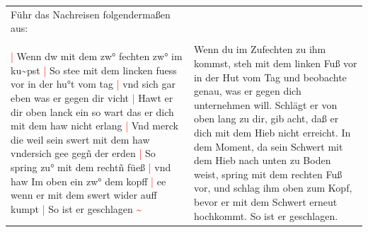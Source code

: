 \begin{longtable}{p{6.25cm}p{6.25cm}}
{{        Führ das Nachreisen folgendermaßen aus:}}
    \\
    \\
    \textcolor{red}{|} Wenn dw mit dem zw° fechten zw° im ku\textasciitilde{}pst
    \textcolor{red}{|} So stee mit dem lincken fuess vor in der hu°t vom tag
    \textcolor{red}{|} vnd sich gar eben was er gegen dir vicht
    \textcolor{red}{|} Hawt er dir oben lanck ein so wart das er dich mit dem haw nicht erlang
    \textcolor{red}{|} Vnd merck die weil sein swert mit dem haw vndersich gee gegñ der erden
    \textcolor{red}{|} So spring zu° mit dem rechtñ füeß
    \textcolor{red}{|} vnd haw Im oben ein zw° dem kopff
    \textcolor{red}{|} ee wenn er mit dem swert wider auff kumpt
    \textcolor{red}{|} So ist er geschlagen \textcolor{red}{\textasciitilde{}}
    &
    Wenn du im Zufechten zu ihm kommst, steh mit dem linken Fuß vor in der Hut vom Tag und beobachte genau, was er gegen dich unternehmen will.
    Schlägt er von oben lang zu dir, gib acht, daß er dich mit dem Hieb nicht erreicht. In dem Moment, da sein Schwert mit dem Hieb nach unten zu Boden weist, spring mit dem rechten Fuß vor, und schlag ihm oben zum Kopf, bevor er mit dem Schwert erneut hochkommt.
    So ist er geschlagen.
\end{longtable}

\newpage

\begin{center}
\end{center}

\newpage

